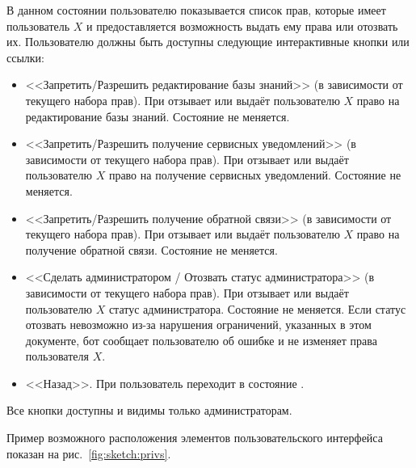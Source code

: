 \begin{enumerate}
                В данном состоянии пользователю показывается список прав, которые имеет пользователь \(X\)
                и предоставляется возможность выдать ему права или отозвать их.
                Пользователю должны быть доступны следующие интерактивные кнопки или ссылки:
                \begin{itemize}
                    \item
                        <<Запретить/Разрешить редактирование базы знаний>>
                        (в зависимости от текущего набора прав).
                        При  отзывает или выдаёт пользователю \(X\) право на редактирование
                        базы знаний. Состояние не меняется.
                    \item
                        <<Запретить/Разрешить получение сервисных уведомлений>>
                        (в зависимости от текущего набора прав).
                        При  отзывает или выдаёт пользователю \(X\) право на получение
                        сервисных уведомлений. Состояние не меняется.
                    \item
                        <<Запретить/Разрешить получение обратной связи>>
                        (в зависимости от текущего набора прав).
                        При  отзывает или выдаёт пользователю \(X\) право на получение
                        обратной связи. Состояние не меняется.
                    \item
                        <<Сделать администратором / Отозвать статус администратора>>
                        (в зависимости от текущего набора прав).
                        При  отзывает или выдаёт пользователю \(X\) статус администратора.
                        Состояние не меняется. Если статус отозвать невозможно из-за нарушения ограничений,
                        указанных в этом документе, бот сообщает пользователю об ошибке и не изменяет
                        права пользователя \(X\).
                    \item
                        <<Назад>>.
                        При  пользователь переходит в состояние
                        \hyperref[itm:req:ui:states:user-privs]
                        {}.
                \end{itemize}

                Все кнопки доступны и видимы только администраторам.

                Пример возможного расположения элементов пользовательского интерфейса показан на
                рис.~\ref{fig:sketch:privs}.


\end{enumerate}
